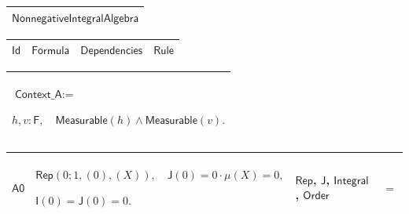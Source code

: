 \documentclass[11pt]{amsart}
\renewcommand{\arraystretch}{1.4}
\newlength{\FTCOneColumnBody}
\newlength{\FTCFourColumnBody}
\begin{document}
{\centering
\renewcommand{\arraystretch}{1.4}
\par\setlength{\parskip}{0pt}\nointerlineskip
\noindent
\begin{tabular}{|@{}>{\centering\arraybackslash}m{\FTCOneColumnBody}|}\hline
$\displaystyle \textsf{NonnegativeIntegralAlgebra}$\\ \hline
\end{tabular}%
\par\setlength{\parskip}{0pt}\nointerlineskip
\noindent
\begin{tabular}{|@{}>{\centering\arraybackslash}m{0.078431\FTCFourColumnBody}|>{\centering\arraybackslash}m{0.535947\FTCFourColumnBody}|>{\centering\arraybackslash}m{0.281045\FTCFourColumnBody}|>{\centering\arraybackslash}m{0.104575\FTCFourColumnBody}|}\hline
$\displaystyle \textsf{Id}$ & $\displaystyle \textsf{Formula}$ & $\displaystyle \textsf{Dependencies}$ & $\displaystyle \textsf{Rule}$\\ \hline
\end{tabular}%
\par\setlength{\parskip}{0pt}\nointerlineskip
\noindent
\begin{tabular}{|@{}>{\centering\arraybackslash}m{\FTCOneColumnBody}|}\hline
$\displaystyle \textsf{Context\_A}:=$\par
$\displaystyle h,v:\textsf{F},\quad\textsf{Measurable}(h)\land\textsf{Measurable}(v).$\\ \hline
\end{tabular}%
\par\setlength{\parskip}{0pt}\nointerlineskip
\noindent
\begin{tabular}{|@{}>{\centering\arraybackslash}m{0.078431\FTCFourColumnBody}|>{\centering\arraybackslash}m{0.535947\FTCFourColumnBody}|>{\centering\arraybackslash}m{0.281045\FTCFourColumnBody}|>{\centering\arraybackslash}m{0.104575\FTCFourColumnBody}|}\hline
\hypertarget{dct:A0}{$\displaystyle \textsf{A0}$} & $\displaystyle \textsf{Rep}(0;1,(0),(X)),\quad\textsf{J}(0)=0\cdot\mu(X)=0,$\par
$\displaystyle \textsf{I}(0)=\textsf{J}(0)=0.$ & \hyperlink{def:Rep}{$\displaystyle \textsf{Rep}$}, \hyperlink{def:J}{$\displaystyle \textsf{J}$}, \hyperlink{lem:Integral}{$\displaystyle \textsf{Integral}$}, \hyperlink{ax:Order}{$\displaystyle \textsf{Order}$} & $\displaystyle =$\\ \hline
\end{tabular}%
\par\setlength{\parskip}{0pt}\nointerlineskip
\noindent
\begin{tabular}{|@{}>{\centering\arraybackslash}m{0.078431\FTCFourColumnBody}|>{\centering\arraybackslash}m{0.535947\FTCFourColumnBody}|>{\centering\arraybackslash}m{0.281045\FTCFourColumnBody}|>{\centering\arraybackslash}m{0.104575\FTCFourColumnBody}|}\hline

\end{tabular}}
\end{document}
